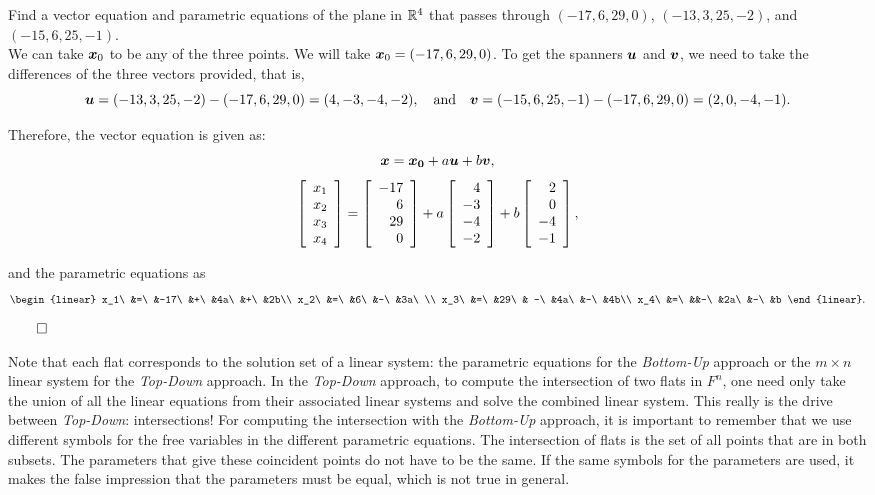 \begin{Exam}\label{exam:planeAB} %
Find a vector equation and parametric equations of the plane in $\mathbb{R}^4$ that passes through $(-17,6,29,0)$, $(-13,3,25,-2)$, and $(-15,6,25,-1)$.\\

We can take $\boldsymbol x_0$ to be any of the three points. We will take $\boldsymbol x_0 = (-17,6,29,0)$. To get the spanners $\boldsymbol u$ and $\boldsymbol v$, we need to take the differences of the three vectors provided, that is, 
\[\boldsymbol u = (-13,3,25,-2) - (-17,6,29,0) = (4,-3,-4,-2),\quad\text{and}\quad \boldsymbol v = (-15,6,25,-1) - (-17,6,29,0) = (2,0,-4,-1).\]

\begin{multicols}{2}
Therefore, the vector equation is given as: \[\boldsymbol x = \boldsymbol{x_0} + a\boldsymbol u + b\boldsymbol v,\]
\[\left[\begin{array}{r} x_1\\x_2\\x_3\\x_4 \end{array}\right] = \left[\begin{array}{r} -17\\6\\29\\0 \end{array}\right] + a\left[\begin{array}{r} 4\\-3\\-4\\-2 \end{array}\right] + b\left[\begin{array}{r} 2\\0\\-4\\-1 \end{array}\right],\]\columnbreak 

\mbox{}\vfill
and the parametric equations as 
\[\begin{linear}
x_1\ &=\ &-17\ &+\ &4a\ &+\ &2b\\
x_2\ &=\ &6\ &-\ &3a\ \\
x_3\ &=\ &29\ & -\ &4a\ &-\ &4b\\
x_4\ &=\ &&-\ &2a\ &-\ &b
\end{linear}.\]$\hfill\qedhere$
\end{multicols}
\end{Exam}\vs

Note that each flat corresponds to the solution set of a linear system: the parametric equations for the \emph{Bottom-Up} approach or the $m\times n$ linear system for the \emph{Top-Down} approach. In the \emph{Top-Down} approach, to compute the intersection of two flats in $F^n$, one need only take the union of all the linear equations from their associated linear systems and solve the combined linear system. This really is the drive between \emph{Top-Down}: intersections! For computing the intersection with the \emph{Bottom-Up} approach, it is important to remember that we use different symbols for the free variables in the different parametric equations. The intersection of flats is the set of all points that are in both subsets. The parameters that give these coincident points do not have to be the same. If the same symbols for the parameters are used, it makes the false impression that the parameters must be equal, which is not true in general.\\

